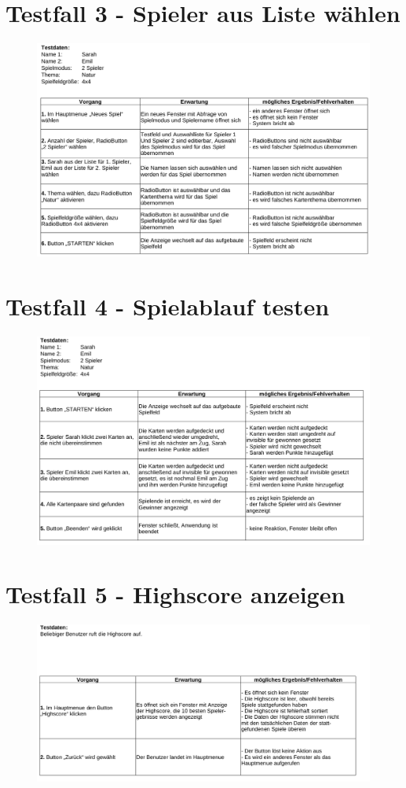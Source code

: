 \clearpage
\section{Testfall 3 - Spieler aus Liste wählen}
\begin{figure}[!h]
	\centering
    \includegraphics[width=15cm]{./Testfall3.png}
	\label{layout_gesamt}
\end{figure}

\clearpage
\section{Testfall 4 - Spielablauf testen}
\begin{figure}[!h]
	\centering
    \includegraphics[width=15cm]{./Testfall4.png}
	\label{layout_gesamt}
\end{figure}

\clearpage
\section{Testfall 5 - Highscore anzeigen}
\begin{figure}[!h]
	\centering
    \includegraphics[width=15cm]{./Testfall5.png}
	\label{layout_gesamt}
\end{figure}
